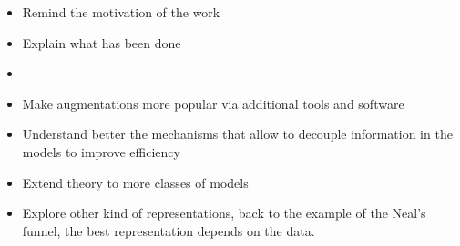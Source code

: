 

\graphicspath{{9_conclusion/figures/}}

\begin{itemize}
    \item Remind the motivation of the work
    \item Explain what has been done
    \item 
    \item Make augmentations more popular via additional tools and software
    \item Understand better the mechanisms that allow to decouple information in the models to improve efficiency
    \item Extend theory to more classes of models
    \item Explore other kind of representations, back to the example of the Neal's funnel, the best representation depends on the data.
\end{itemize}


